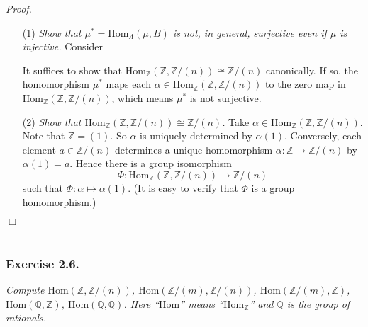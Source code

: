 \documentclass{article}
\begin{document}
\emph{Proof.}
\begin{enumerate}
\item[(1)]
  \emph{Show that $\mu^{*} = \mathrm{Hom}_{\Lambda}(\mu,B)$ is not, in general,
  surjective even if $\mu$ is injective.}
  Consider
  \begin{center}
  \end{center}
  It suffices to show that
  $\mathrm{Hom}_{\mathbb{Z}}(\mathbb{Z},\mathbb{Z}/(n)) \cong \mathbb{Z}/(n)$
  canonically.
  If so, the homomorphism $\mu^{*}$ maps each
  $\alpha \in \mathrm{Hom}_{\mathbb{Z}}(\mathbb{Z},\mathbb{Z}/(n))$
  to the zero map in $\mathrm{Hom}_{\mathbb{Z}}(\mathbb{Z},\mathbb{Z}/(n))$,
  which means $\mu^{*}$ is not surjective.

\item[(2)]
  \emph{Show that $\mathrm{Hom}_{\mathbb{Z}}(\mathbb{Z},\mathbb{Z}/(n)) \cong \mathbb{Z}/(n)$.}
  Take $\alpha \in \mathrm{Hom}_{\mathbb{Z}}(\mathbb{Z},\mathbb{Z}/(n))$.
  Note that $\mathbb{Z} = (1)$.
  So $\alpha$ is uniquely determined by $\alpha(1)$.
  Conversely, each element $a \in \mathbb{Z}/(n)$ determines
  a unique homomorphism $\alpha: \mathbb{Z} \to \mathbb{Z}/(n)$ by $\alpha(1) = a$.
  Hence there is a group isomorphism
  \[
    \Phi: \mathrm{Hom}_{\mathbb{Z}}(\mathbb{Z},\mathbb{Z}/(n)) \to \mathbb{Z}/(n)
  \]
  such that $\Phi: \alpha \mapsto \alpha(1)$.
  (It is easy to verify that $\Phi$ is a group homomorphism.)
\end{enumerate}
$\Box$ \\\\






\subsubsection*{Exercise 2.6.}
\emph{Compute
$\mathrm{Hom}(\mathbb{Z},\mathbb{Z}/(n))$,
$\mathrm{Hom}(\mathbb{Z}/(m),\mathbb{Z}/(n))$,
$\mathrm{Hom}(\mathbb{Z}/(m),\mathbb{Z})$,
$\mathrm{Hom}(\mathbb{Q},\mathbb{Z})$,
$\mathrm{Hom}(\mathbb{Q},\mathbb{Q})$.
Here ``$\mathrm{Hom}$'' means ``$\mathrm{Hom}_{\mathbb{Z}}$''
and $\mathbb{Q}$ is the group of rationals.} \\
\end{document}
